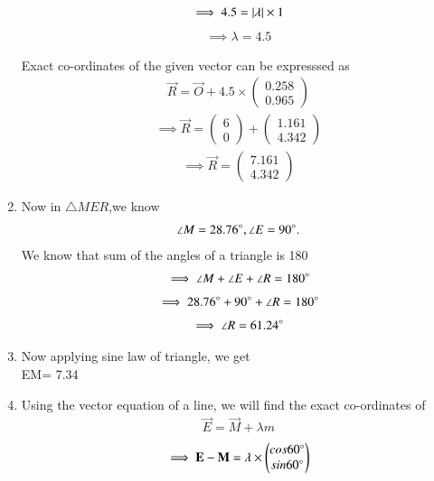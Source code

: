 \documentclass[journal,12pt,twocolumn]{IEEEtran}
\newcommand{\myvec}[1]{\ensuremath{\begin{pmatrix}#1\end{pmatrix}}}
\begin{document}
\begin{enumerate}
\begin{align}
\end{align}
\begin{align}
   \implies 4.5= \vert\lambda\vert \times 1
\end{align}
\begin{align}
    \implies \lambda = 4.5
\end{align}
\begin{lemma}
Exact co-ordinates of the given vector  can be expresssed as
\begin{align}
 \vec{R}= \vec{O}+ 4.5\times \myvec{0.258\\0.965}
 \end{align}
 \begin{align}
     \implies \vec{R}= \myvec{6\\0}+\myvec{1.161\\4.342}
 \end{align}
 \begin{align}
    \implies  \vec{R}= \myvec{7.161\\4.342}
 \end{align}
 \end{lemma}
 \item Now in $\triangle MER$,we know
 \begin{align}
 \angle M=28.76\degree, \angle E=90\degree.
  \end{align}
  We know that sum of the angles of a triangle is 180\degree
 \begin{align}
     \implies \angle M+ \angle E+ \angle R= 180\degree
 \end{align}
 \begin{align}
     \implies 28.76\degree+90\degree+\angle R= 180\degree
 \end{align}
 \begin{align}
 \implies \angle R=61.24\degree
 \end{align}
 \item Now applying sine law of triangle, we get \\
 EM= 7.34\\
\item Using the vector equation of a line, we will find the exact co-ordinates of  
 \begin{align}
     \vec{E}= \vec{M}+ \lambda m
 \end{align}
 \begin{align}
     \implies  \vec{E}-\vec{M}= \lambda \times \myvec{cos60\degree\\sin60\degree}
 \end{align}
 \begin{align}

\end{align}
\end{enumerate}
\end{document}
